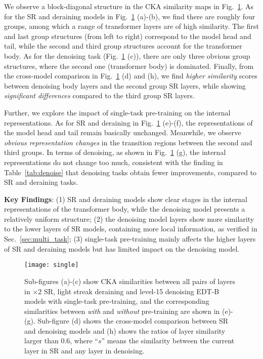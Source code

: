 \documentclass[runningheads]{llncs}
\begin{document}
	We observe a block-diagonal structure in the CKA similarity maps in Fig.~\ref{fig:single}. As for the SR and deraining models in Fig.~\ref{fig:single} (a)-(b), we find there are roughly four groups, among which a range of transformer layers are of high similarity. The first and last group structures (from left to right) correspond to the model head and tail, while the second and third group structures account for the transformer body. As for the denoising task (Fig.~\ref{fig:single} (c)), there are only three obvious group structures, where the second one (transformer body) is dominated. Finally, from the cross-model comparison in Fig.~\ref{fig:single} (d) and (h), we find \textit{higher similarity} scores between denoising body layers and the second group SR layers, while showing \textit{significant differences} compared to the third group SR layers.
	
	Further, we explore the impact of single-task pre-training on the internal representations. As for SR and deraining in Fig.~\ref{fig:single} (e)-(f), the representations of the model head and tail remain basically unchanged. Meanwhile, we observe \textit{obvious representation changes} in the transition regions between the second and third groups. In terms of denoising, as shown in Fig.~\ref{fig:single} (g), the internal representations do not change too much, consistent with the finding in Table~\ref{tab:denoise} that denoising tasks obtain fewer improvements, compared to SR and deraining tasks.
	
	\vspace{0.05in}
	\noindent\textbf{Key Findings}: (1) SR and deraining models show clear stages in the internal representations of the transformer body, while the denoising model presents a relatively uniform structure; (2) the denoising model layers show more similarity to the lower layers of SR models, containing more local information, as verified in Sec.~\ref{sec:multi_task}; (3) single-task pre-training mainly affects the higher layers of SR and deraining models but has limited impact on the denoising model. 
	
	\begin{figure}[t]
		\begin{center}
			\texttt{[image: single]}
		\end{center}
		\vspace{-0.2in}
		\caption{Sub-figures (a)-(c) show CKA similarities between all pairs of layers in $\times 2$ SR, light streak deraining and level-15 denoising EDT-B models with single-task pre-training, and the corresponding similarities between \textit{with} and \textit{without} pre-training are shown in (e)-(g). Sub-figure (d) shows the cross-model comparison between SR and denoising models and (h) shows the ratios of layer similarity larger than 0.6, where ``$s$'' means the similarity between the current layer in SR and any layer in denoising.}
		\label{fig:single}
		\vspace{-0.1in}
	\end{figure}
	
\end{document}
